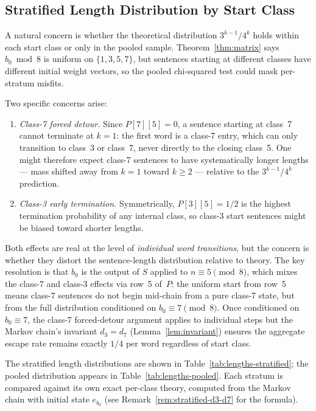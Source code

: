 \documentclass[12pt]{article}
\theoremstyle{definition}
\theoremstyle{remark}
\newcommand{\Sm}{S}
\begin{document}
\subsection*{Stratified Length Distribution by Start Class}

A natural concern is whether the theoretical distribution $3^{k-1}/4^k$
holds within each start class or only in the pooled sample.
Theorem~\ref{thm:matrix} says $b_0 \bmod 8$ is uniform on $\{1,3,5,7\}$,
but sentences starting at different classes have different initial weight
vectors, so the pooled chi-squared test could mask per-stratum misfits.

Two specific concerns arise:
\begin{enumerate}
  \item \emph{Class-7 forced detour.}
        Since $P[7][5] = 0$, a sentence starting at class~7 cannot terminate
        at $k=1$: the first word is a class-7 entry, which can only transition
        to class~3 or class~7, never directly to the closing class~5.
        One might therefore expect class-7 sentences to have
        systematically longer lengths — mass shifted away from $k=1$
        toward $k \geq 2$ — relative to the $3^{k-1}/4^k$ prediction.
  \item \emph{Class-3 early termination.}
        Symmetrically, $P[3][5] = 1/2$ is the highest termination probability
        of any internal class, so class-3 start sentences might be biased
        toward shorter lengths.
\end{enumerate}
Both effects are real at the level of \emph{individual word transitions},
but the concern is whether they distort the sentence-length distribution
relative to theory.
The key resolution is that $b_0$ is the output of $\Sm$ applied to
$n \equiv 5 \pmod 8$, which mixes the class-7 and class-3 effects
via row~5 of~$P$: the uniform start from row~5 means class-7 sentences
do not begin mid-chain from a pure class-7 state, but from the full
distribution conditioned on $b_0 \equiv 7 \pmod 8$.
Once conditioned on $b_0 \equiv 7$, the class-7 forced-detour argument
applies to individual steps but the Markov chain's invariant
$d_3 = d_7$ (Lemma~\ref{lem:invariant}) ensures the aggregate escape rate
remains exactly $1/4$ per word regardless of start class.

The stratified length distributions are shown in Table~\ref{tab:lengths-stratified};
the pooled distribution appears in Table~\ref{tab:lengths-pooled}.
Each stratum is compared against its own exact per-class theory, computed
from the Markov chain with initial state $e_{b_0}$
(see Remark~\ref{rem:stratified-d3-d7} for the formula).
\end{document}
